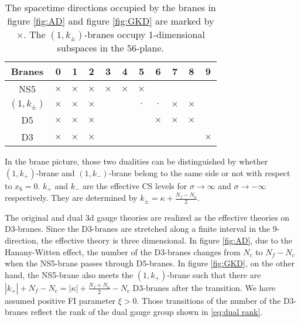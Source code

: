 \documentclass[a4paper,11pt]{article}
\begin{document}
\begin{table}[tbp]
\centering
\begin{tabular}{|c|cccccccccc|}
\hline
Branes & 0 & 1 & 2 & 3 & 4 & 5 & 6 & 7 & 8 & 9 \\
\hline
NS5 & $\times$ & $\times$ & $\times$ & $\times$ & $\times$ & $\times$ & & & & \\
$(1,k_\pm)$ & $\times$ & $\times$ & $\times$ & & & $\cdot$ & $\cdot$ & $\times$ & $\times$ & \\
D5 & $\times$ & $\times$ & $\times$ & & & & $\times$ & $\times$ & $\times$ & \\
D3 & $\times$ & $\times$ & $\times$ & & & & & & & $\times$ \\
\hline
\end{tabular}
\caption{\label{tab:AGK branes} The spacetime directions occupied by the branes in figure \ref{fig:AD} and figure \ref{fig:GKD} are marked by $\times$. The $(1,k_\pm)$-branes occupy 1-dimensional subspaces in the 56-plane.}
\end{table}
%
In the brane picture, those two dualities can be distinguished by whether $(1,k_+)$-brane and $(1,k_-)$-brane belong to the same side or not with respect to $x_6 = 0$. $k_+$ and $k_-$ are the effective CS levels for $\sigma \rightarrow \infty$ and $\sigma \rightarrow -\infty$ respectively. They are determined by $k_\pm = \kappa+\frac{N_f-N_a}{2}$.

The original and dual 3d gauge theories are realized as the effective theories on D3-branes. Since the D3-branes are stretched along a finite interval in the 9-direction, the effective theory is three dimensional. In figure \ref{fig:AD}, due to the Hanany-Witten effect, the number of the D3-branes changes from $N_c$ to $N_f-N_c$ when the NS5-brane passes through D5-branes. In figure \ref{fig:GKD}, on the other hand, the NS5-brane also meets the $(1,k_+)$-brane such that there are $|k_+|+N_f-N_c = |\kappa|+\frac{N_f+N_a}{2}-N_c$ D3-branes after the transition. We have assumed positive FI parameter $\xi > 0$. Those transitions of the number of the D3-branes reflect the rank of the dual gauge group shown in \eqref{eq:dual rank}.
\end{document}
